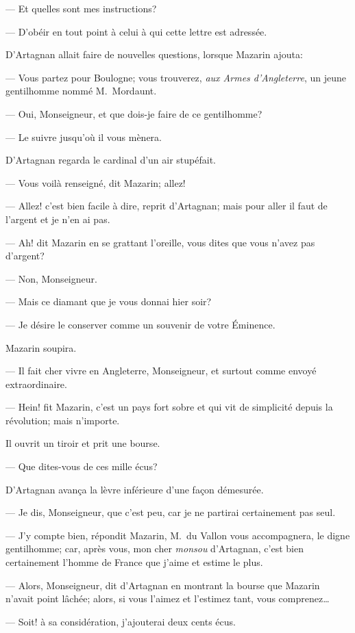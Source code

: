 — Et quelles sont mes instructions?

— D'obéir en tout point à celui à qui cette lettre est adressée.

D'Artagnan allait faire de nouvelles questions, lorsque Mazarin ajouta:

— Vous partez pour Boulogne; vous trouverez, \textit{aux Armes d'Angleterre}, un jeune gentilhomme nommé M.~Mordaunt.

— Oui, Monseigneur, et que dois-je faire de ce gentilhomme?

— Le suivre jusqu'où il vous mènera.

D'Artagnan regarda le cardinal d'un air stupéfait.

— Vous voilà renseigné, dit Mazarin; allez!

— Allez! c'est bien facile à dire, reprit d'Artagnan; mais pour aller il faut de l'argent et je n'en ai pas.

— Ah! dit Mazarin en se grattant l'oreille, vous dites que vous n'avez pas d'argent?

— Non, Monseigneur.

— Mais ce diamant que je vous donnai hier soir?

— Je désire le conserver comme un souvenir de votre Éminence.

Mazarin soupira.

— Il fait cher vivre en Angleterre, Monseigneur, et surtout comme envoyé extraordinaire.

— Hein! fit Mazarin, c'est un pays fort sobre et qui vit de simplicité depuis la révolution; mais n'importe.

Il ouvrit un tiroir et prit une bourse.

— Que dites-vous de ces mille écus?

D'Artagnan avança la lèvre inférieure d'une façon démesurée.

— Je dis, Monseigneur, que c'est peu, car je ne partirai certainement pas seul.

— J'y compte bien, répondit Mazarin, M.~du Vallon vous accompagnera, le digne gentilhomme; car, après vous, mon cher \textit{monsou} d'Artagnan, c'est bien certainement l'homme de France que j'aime et estime le plus.

— Alors, Monseigneur, dit d'Artagnan en montrant la bourse que Mazarin n'avait point lâchée; alors, si vous l'aimez et l'estimez tant, vous comprenez\dots

— Soit! à sa considération, j'ajouterai deux cents écus.

